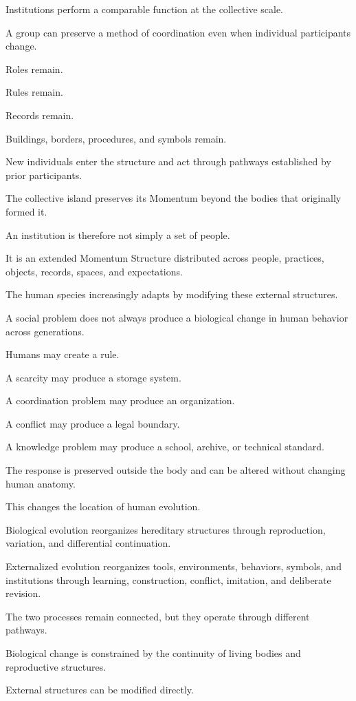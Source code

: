 Institutions perform a comparable function at the collective scale.

A group can preserve a method of coordination even when individual participants change.

Roles remain.

Rules remain.

Records remain.

Buildings, borders, procedures, and symbols remain.

New individuals enter the structure and act through pathways established by prior participants.

The collective island preserves its Momentum beyond the bodies that originally formed it.

An institution is therefore not simply a set of people.

It is an extended Momentum Structure distributed across people, practices, objects, records, spaces, and expectations.

The human species increasingly adapts by modifying these external structures.

A social problem does not always produce a biological change in human behavior across generations.

Humans may create a rule.

A scarcity may produce a storage system.

A coordination problem may produce an organization.

A conflict may produce a legal boundary.

A knowledge problem may produce a school, archive, or technical standard.

The response is preserved outside the body and can be altered without changing human anatomy.

This changes the location of human evolution.

Biological evolution reorganizes hereditary structures through reproduction, variation, and differential continuation.

Externalized evolution reorganizes tools, environments, behaviors, symbols, and institutions through learning, construction, conflict, imitation, and deliberate revision.

The two processes remain connected, but they operate through different pathways.

Biological change is constrained by the continuity of living bodies and reproductive structures.

External structures can be modified directly.

